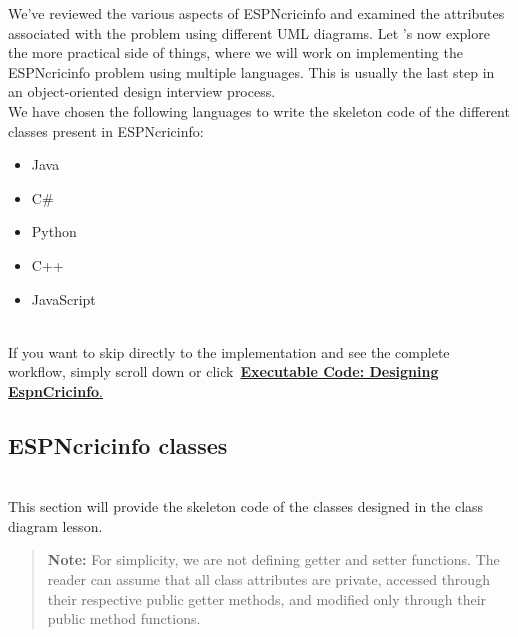 

We've reviewed the various aspects of ESPNcricinfo and examined the attributes associated with the problem using different UML diagrams. Let 's now explore the more practical side of things, where we will work on implementing the ESPNcricinfo problem using multiple languages. This is usually the last step in an object-oriented design interview process.
\\
We have chosen the following languages to write the skeleton code of the different classes present in ESPNcricinfo:

\begin{itemize}
\item
\protect{}\label{FVUQMGyEq1qx1IFHDDoeV}
Java
\item
\protect{}\label{BQPC-EPpzSIoE8cqHxJ49}
C\#
\item
\protect{}\label{jbZ_X10wGhRaR6tuUBN9W}
Python
\item
\protect{}\label{CVRaDvNZi7CoA_A8fRwyY}
C++
\item
\protect{}\label{t97jgTbx07QKzAJylKKkh}
JavaScript
\end{itemize}
\\
If you want to skip directly to the implementation and see the complete workflow, simply scroll down or click~\hyperref[Executable-code-Designing-ESPNcricinfo]{\textbf{Executable Code: Designing EspnCricinfo}.}

\subsection{ESPNcricinfo classes}\label{w84oQhMZPtIWnZVcnG0HE}
\\
This section will provide the skeleton code of the classes designed in the class diagram lesson.
\begin{quote}
\textbf{Note:} For simplicity, we are not defining getter and setter functions. The reader can assume that all class attributes are private, accessed through their respective public getter methods, and modified only through their public method functions.
\end{quote}
